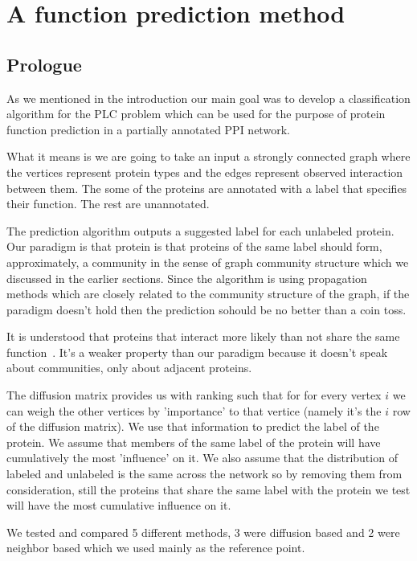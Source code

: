 \section{A function prediction method}
\subsection*{Prologue}
As we mentioned in the introduction our main goal was to develop
a classification algorithm for the PLC problem which can be used for the
purpose of protein function prediction in a partially annotated PPI
network.

What it means is we are going to take an input a strongly connected
graph where the vertices represent protein types and the edges represent
observed interaction between them. The some of the proteins are
annotated with a label that specifies their function. The rest are
unannotated.

The prediction algorithm outputs a suggested label for each unlabeled protein.
Our paradigm is that protein is that proteins of the
same label should form, approximately, a community in the sense of
graph community structure which we discussed in the earlier sections.
Since the algorithm is using propagation methods which are closely
related to the community structure of the graph, if the paradigm doesn't
hold then the prediction sohould be no better than a coin toss.

It is understood that proteins that interact more likely than not
share the same function~\cite{schwikowski2000network}. It's a weaker
property than our paradigm because it doesn't speak about communities,
only about adjacent proteins.

The diffusion matrix provides us with ranking such that for for every
vertex $i$ we can weigh the other vertices by 'importance' to that
vertice (namely it's the $i$ row of the diffusion matrix). We use that
information to predict the label of the protein. We assume that members
of the same label of the protein will have cumulatively the most
'influence' on it. We also assume that the distribution of labeled and
unlabeled is the same across the network so by removing them from
consideration, still the proteins that share the same label with the
protein we test will have the most cumulative influence on it.

We tested and compared 5 different methods, 3 were diffusion based and 2
were neighbor based which we used mainly as the reference point.

